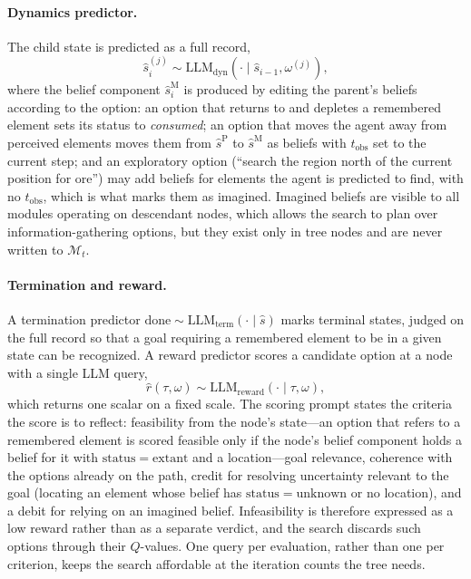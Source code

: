 \documentclass[11pt]{article}
\newcommand{\llm}[1]{\mathrm{LLM}_{\mathrm{#1}}}
\newcommand{\calM}{\mathcal{M}}
\newcommand{\shat}{\hat{s}}
\newcommand{\stat}{\mathrm{status}}
\newcommand{\tobs}{t_{\mathrm{obs}}}
\begin{document}
\paragraph{Dynamics predictor.}
The child state is predicted as a full record,
\begin{equation}
\shat^{(j)}_i\sim\llm{dyn}(\cdot\mid\shat_{i-1},\omega^{(j)}),
\label{eq:dyn}
\end{equation}
where the belief component $\hat s^{\mathrm{M}}_i$ is produced by editing the parent's beliefs according to the option: an option that returns to and depletes a remembered element sets its status to \emph{consumed}; an option that moves the agent away from perceived elements moves them from $\hat s^{\mathrm{P}}$ to $\hat s^{\mathrm{M}}$ as beliefs with $\tobs$ set to the current step; and an exploratory option (``search the region north of the current position for ore'') may add beliefs for elements the agent is predicted to find, with no $\tobs$, which is what marks them as imagined. Imagined beliefs are visible to all modules operating on descendant nodes, which allows the search to plan over information-gathering options, but they exist only in tree nodes and are never written to $\calM_t$.

\paragraph{Termination and reward.}
A termination predictor $\mathrm{done}\sim\llm{term}(\cdot\mid\shat)$ marks terminal states, judged on the full record so that a goal requiring a remembered element to be in a given state can be recognized. 
A reward predictor scores a candidate option at a node with a single LLM query,
\begin{equation}
\hat r(\tau,\omega)\sim\llm{reward}(\cdot\mid\tau,\omega),
\label{eq:reward}
\end{equation}
which returns one scalar on a fixed scale. The scoring prompt states the criteria the score is to reflect: feasibility from the node's state---an option that refers to a remembered element is scored feasible only if the node's belief component holds a belief for it with $\stat=\mathrm{extant}$ and a location---goal relevance, coherence with the options already on the path, credit for resolving uncertainty relevant to the goal (locating an element whose belief has $\stat=\mathrm{unknown}$ or no location), and a debit for relying on an imagined belief. Infeasibility is therefore expressed as a low reward rather than as a separate verdict, and the search discards such options through their $Q$-values. One query per evaluation, rather than one per criterion, keeps the search affordable at the iteration counts the tree needs.
\end{document}
